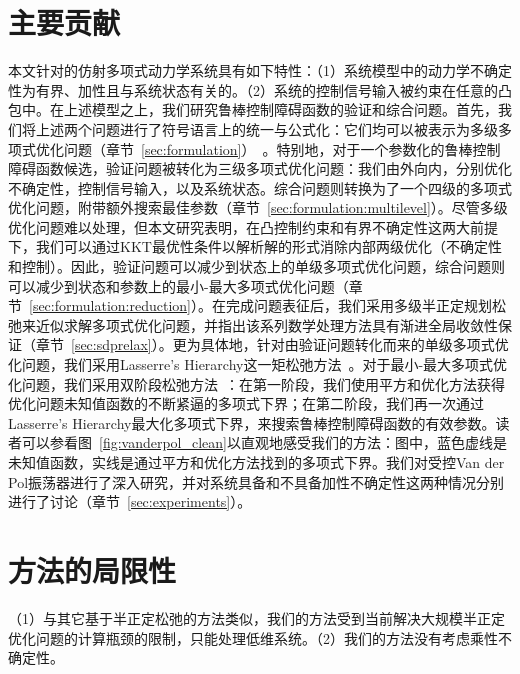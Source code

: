 \section{主要贡献}
本文针对的仿射多项式动力学系统具有如下特性：（1）系统模型中的动力学不确定性为有界、加性且与系统状态有关的。（2）系统的控制信号输入被约束在任意的凸包中。在上述模型之上，我们研究鲁棒控制障碍函数的验证和综合问题。首先，我们将上述两个问题进行了符号语言上的统一与公式化：它们均可以被表示为多级多项式优化问题（章节~\ref{sec:formulation}）~\cite{bennett22mp-hierarchical}。特别地，对于一个参数化的鲁棒控制障碍函数候选，验证问题被转化为三级多项式优化问题：我们由外向内，分别优化不确定性，控制信号输入，以及系统状态。综合问题则转换为了一个四级的多项式优化问题，附带额外搜索最佳参数（章节~\ref{sec:formulation:multilevel}）。尽管多级优化问题难以处理，但本文研究表明，在凸控制约束和有界不确定性这两大前提下，我们可以通过KKT最优性条件以解析解的形式消除内部两级优化（不确定性和控制）。因此，验证问题可以减少到状态上的单级多项式优化问题，综合问题则可以减少到状态和参数上的最小-最大多项式优化问题（章节~\ref{sec:formulation:reduction}）。在完成问题表征后，我们采用多级半正定规划松弛来近似求解多项式优化问题，并指出该系列数学处理方法具有渐进全局收敛性保证（章节~\ref{sec:sdprelax}）。更为具体地，针对由验证问题转化而来的单级多项式优化问题，我们采用Lasserre's Hierarchy这一矩松弛方法~\cite{lasserre01siopt-global}。对于最小-最大多项式优化问题，我们采用双阶段松弛方法~\cite{lasserre11jgo-minmaxpop}：在第一阶段，我们使用平方和优化方法获得优化问题未知值函数的不断紧逼的多项式下界；在第二阶段，我们再一次通过Lasserre's Hierarchy最大化多项式下界，来搜索鲁棒控制障碍函数的有效参数。读者可以参看图~\ref{fig:vanderpol_clean}以直观地感受我们的方法：图中，蓝色虚线是未知值函数，实线是通过平方和优化方法找到的多项式下界。我们对受控Van der Pol振荡器进行了深入研究，并对系统具备和不具备加性不确定性这两种情况分别进行了讨论（章节~\ref{sec:experiments}）。

\section{方法的局限性}
（1）与其它基于半正定松弛的方法类似，我们的方法受到当前解决大规模半正定优化问题的计算瓶颈的限制，只能处理低维系统。（2）我们的方法没有考虑乘性不确定性。



